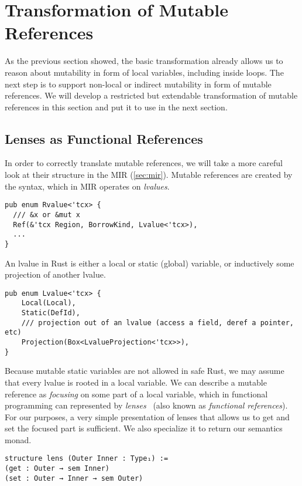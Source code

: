 \section{Transformation of Mutable References}
\label{sec:mutref}

As the previous section showed, the basic transformation already allows us to reason about mutability in
form of local variables, including inside loops. The next step is to support
non-local or indirect mutability in form of mutable references. We will develop
a restricted but extendable transformation of mutable references in this section
and put it to use in the next section.

\subsection{Lenses as Functional References}

In order to correctly translate mutable references, we will take a more careful
look at their structure in the MIR (\autoref{sec:mir}). Mutable references are
created by the  syntax, which in MIR operates on \emph{lvalues}.

\begin{verbatim}
pub enum Rvalue<'tcx> {
  /// &x or &mut x
  Ref(&'tcx Region, BorrowKind, Lvalue<'tcx>),
  ...
}
\end{verbatim}

An lvalue in Rust is either a local or static (global) variable, or inductively some
projection of another lvalue.

\begin{verbatim}
pub enum Lvalue<'tcx> {
    Local(Local),
    Static(DefId),
    /// projection out of an lvalue (access a field, deref a pointer, etc)
    Projection(Box<LvalueProjection<'tcx>>),
}
\end{verbatim}

Because mutable static variables are not allowed in safe Rust, we may assume
that every lvalue is rooted in a local variable. We can describe a mutable
reference as \emph{focusing} on some part of a local variable, which in
functional programming can represented by
\emph{lenses}~\cite{foster2005combinators} (also known as \emph{functional
  references}). For our purposes, a very simple presentation of lenses that
allows us to get and set the focused part is sufficient. We also specialize it
to return our semantics monad.

\begin{verbatim}
structure lens (Outer Inner : Type₁) :=
(get : Outer → sem Inner)
(set : Outer → Inner → sem Outer)
\end{verbatim}

